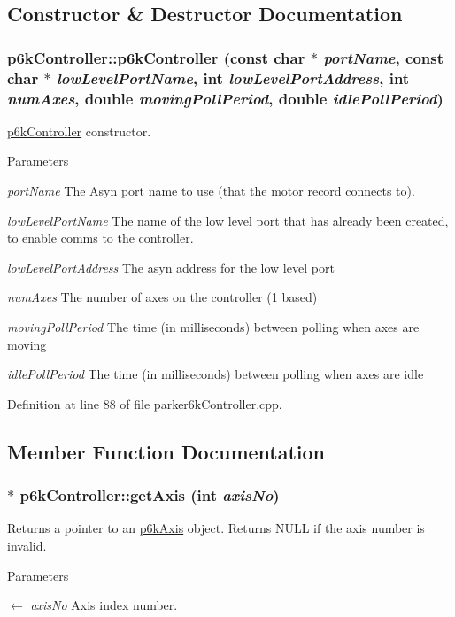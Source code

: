 \subsection{Constructor \& Destructor Documentation}
\hypertarget{classp6kController_ac4f52e54e4f8047ac602b2760aaa0792}{
\subsubsection[{p6kController}]{\setlength{\rightskip}{0pt plus 5cm}p6kController::p6kController (const char $\ast$ {\em portName}, \/  const char $\ast$ {\em lowLevelPortName}, \/  int {\em lowLevelPortAddress}, \/  int {\em numAxes}, \/  double {\em movingPollPeriod}, \/  double {\em idlePollPeriod})}}
\label{classp6kController_ac4f52e54e4f8047ac602b2760aaa0792}
\hyperlink{classp6kController}{p6kController} constructor. 
\begin{DoxyParams}{Parameters}
\item[{\em portName}]The Asyn port name to use (that the motor record connects to). \item[{\em lowLevelPortName}]The name of the low level port that has already been created, to enable comms to the controller. \item[{\em lowLevelPortAddress}]The asyn address for the low level port \item[{\em numAxes}]The number of axes on the controller (1 based) \item[{\em movingPollPeriod}]The time (in milliseconds) between polling when axes are moving \item[{\em idlePollPeriod}]The time (in milliseconds) between polling when axes are idle \end{DoxyParams}


Definition at line 88 of file parker6kController.cpp.

\subsection{Member Function Documentation}
\hypertarget{classp6kController_a1895dba80778089467a1a5d4554fd4bb}{
\subsubsection[{getAxis}]{ $\ast$ p6kController::getAxis (int {\em axisNo})}}
\label{classp6kController_a1895dba80778089467a1a5d4554fd4bb}
Returns a pointer to an \hyperlink{classp6kAxis}{p6kAxis} object. Returns NULL if the axis number is invalid. 
\begin{DoxyParams}{Parameters}
\item[\mbox{$\leftarrow$} {\em axisNo}]Axis index number. \end{DoxyParams}


